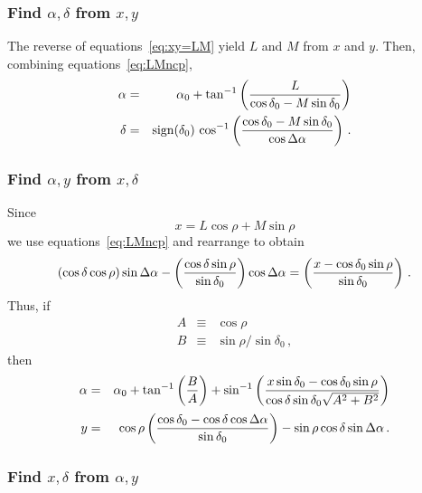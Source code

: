 \subsubsection{Find $\alpha,\delta$ from $x,y$}

The reverse of equations~\ref{eq:xy=LM} yield $L$ and $M$ from $x$ and
$y$.  Then, combining equations~\ref{eq:LMncp},
\begin{eqnarray*}
  \alpha & = &\alpha_0 + \tan^{-1}\left( \frac{L}{\cos
              \delta_0-M\sin\delta_0}\right) \\
  \delta & = &\hbox{sign}(\delta_0)\,\cos^{-1}\left( \frac{\cos
       \delta_0-M\sin\delta_0}{\cos\Delta\alpha}\right) \, .
\end{eqnarray*}

\subsubsection{Find $\alpha,y$ from $x,\delta$}

Since
\begin{displaymath}
  x = L\cos\rho + M\sin\rho
\end{displaymath}
we use equations~\ref{eq:LMncp} and rearrange to obtain
\begin{displaymath}
  (\cos\delta\cos\rho)\sin\Delta\alpha - \left(\frac{\cos\delta
     \sin\rho}{\sin\delta_0}\right) \cos\Delta\alpha =
     \left(\frac{x-\cos\delta_0\sin\rho}{\sin\delta_0}\right) \, .
\end{displaymath}
Thus, if
\begin{eqnarray*}
  A & \equiv &\cos\rho \\
  B & \equiv &\sin\rho/\sin\delta_0 \, ,
\end{eqnarray*}
then
\begin{eqnarray*}
  \alpha & = &\alpha_0 + \tan^{-1}\left( \frac{B}{A} \right) +
              \sin^{-1}\left( \frac{x\sin\delta_0-\cos\delta_0\sin
              \rho}{\cos\delta\sin\delta_0\sqrt{A^2+B^2}} \right) \\
\noalign{\vskip 2pt}
 y & = &\cos\rho \left( \frac{\cos\delta_0 -\cos\delta\cos\Delta
               \alpha}{\sin\delta_0} \right) -\sin\rho\cos\delta
               \sin\da \, .
\end{eqnarray*}

\subsubsection{Find $x,\delta$ from $\alpha,y$}

